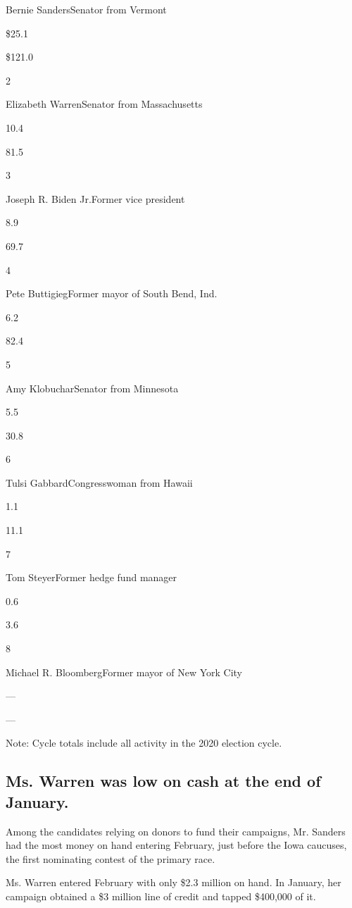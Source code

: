 Bernie SandersSenator from Vermont

\$25.1

\$121.0

2

Elizabeth WarrenSenator from Massachusetts

10.4

81.5

3

Joseph R. Biden Jr.Former vice president

8.9

69.7

4

Pete ButtigiegFormer mayor of South Bend, Ind.

6.2

82.4

5

Amy KlobucharSenator from Minnesota

5.5

30.8

6

Tulsi GabbardCongresswoman from Hawaii

1.1

11.1

7

Tom SteyerFormer hedge fund manager

0.6

3.6

8

Michael R. BloombergFormer mayor of New York City

---

---

Note: Cycle totals include all activity in the 2020 election cycle.

\hypertarget{ms-warren-was-low-on-cash-at-the-end-of-january}{%
\subsection{Ms. Warren was low on cash at the end of
January.}\label{ms-warren-was-low-on-cash-at-the-end-of-january}}

Among the candidates relying on donors to fund their campaigns, Mr.
Sanders had the most money on hand entering February, just before the
Iowa caucuses, the first nominating contest of the primary race.

Ms. Warren entered February with only \$2.3 million on hand. In January,
her campaign obtained a \$3 million line of credit and tapped \$400,000
of it.

